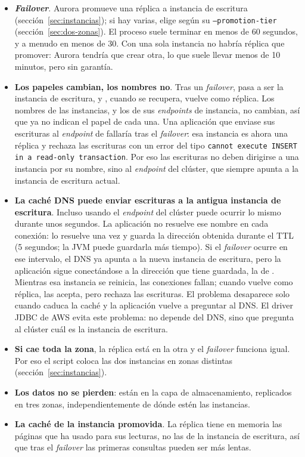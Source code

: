 \documentclass[12pt,a4paper]{article}
\begin{document}
\begin{itemize}
    \item \textbf{\textit{Failover}}. Aurora promueve una réplica a instancia de escritura (sección~\ref{sec:instancias}); si hay varias, elige según su \texttt{--promotion-tier} (sección~\ref{sec:dos-zonas}). El proceso suele terminar en menos de 60 segundos, y a menudo en menos de 30. Con una sola instancia no habría réplica que promover: Aurora tendría que crear otra, lo que suele llevar menos de 10 minutos, pero sin garantía.
    \item \textbf{Los papeles cambian, los nombres no}. Tras un \textit{failover}, \texttt{} pasa a ser la instancia de escritura, y \texttt{}, cuando se recupera, vuelve como réplica. Los nombres de las instancias, y los de sus \textit{endpoints} de instancia, no cambian, así que ya no indican el papel de cada una. Una aplicación que enviase sus escrituras al \textit{endpoint} de \texttt{} fallaría tras el \textit{failover}: esa instancia es ahora una réplica y rechaza las escrituras con un error del tipo \texttt{cannot execute INSERT in a read-only transaction}. Por eso las escrituras no deben dirigirse a una instancia por su nombre, sino al \textit{endpoint} del clúster, que siempre apunta a la instancia de escritura actual.
    \item \textbf{La caché DNS puede enviar escrituras a la antigua instancia de escritura}. Incluso usando el \textit{endpoint} del clúster puede ocurrir lo mismo durante unos segundos. La aplicación no resuelve ese nombre en cada conexión: lo resuelve una vez y guarda la dirección obtenida durante el TTL (5 segundos; la JVM puede guardarla más tiempo). Si el \textit{failover} ocurre en ese intervalo, el DNS ya apunta a la nueva instancia de escritura, pero la aplicación sigue conectándose a la dirección que tiene guardada, la de \texttt{}. Mientras esa instancia se reinicia, las conexiones fallan; cuando vuelve como réplica, las acepta, pero rechaza las escrituras. El problema desaparece solo cuando caduca la caché y la aplicación vuelve a preguntar al DNS. El driver JDBC de AWS evita este problema: no depende del DNS, sino que pregunta al clúster cuál es la instancia de escritura.
    \item \textbf{Si cae toda la zona}, la réplica está en la otra y el \textit{failover} funciona igual. Por eso el script coloca las dos instancias en zonas distintas (sección~\ref{sec:instancias}).
    \item \textbf{Los datos no se pierden}: están en la capa de almacenamiento, replicados en tres zonas, independientemente de dónde estén las instancias.
    \item \textbf{La caché de la instancia promovida}. La réplica tiene en memoria las páginas que ha usado para sus lecturas, no las de la instancia de escritura, así que tras el \textit{failover} las primeras consultas pueden ser más lentas.
\end{itemize}
\end{document}
